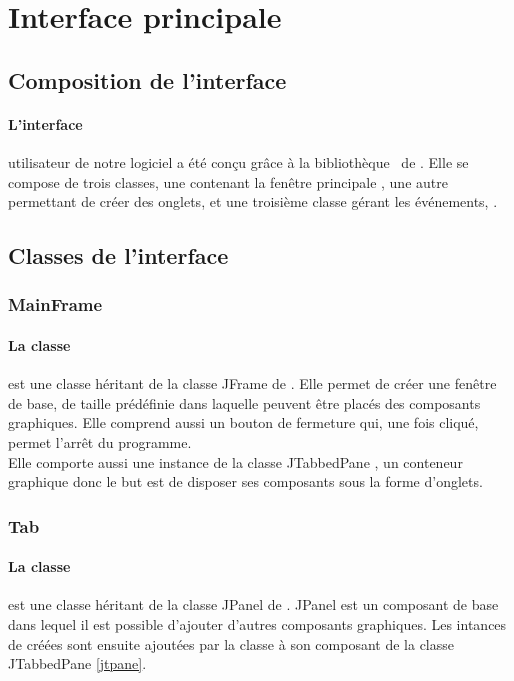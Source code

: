 \clearpage

\section{Interface principale}
\label{sec:menu}

\subsection{Composition de l'interface}

\paragraph{L'interface} utilisateur de notre logiciel a été conçu grâce à la bibliothèque \Swing \ de \Java. Elle se compose de trois classes, une contenant la fenêtre principale , une autre permettant de créer des onglets,  et une troisième classe gérant les événements, .
 
\subsection{Classes de l'interface}

\subsubsection{MainFrame}

\paragraph{La classe } est une classe héritant de la classe JFrame de \Swing. Elle permet de créer une fenêtre de base, de taille prédéfinie dans laquelle peuvent être placés des composants graphiques. Elle comprend aussi un bouton de fermeture qui, une fois cliqué, permet l'arrêt du programme.\\
Elle comporte aussi une instance de la classe JTabbedPane \label{jtpane}, un conteneur graphique donc le but est de disposer ses composants sous la forme d'onglets.

\subsubsection{Tab}

\paragraph{La classe } est une classe héritant de la classe JPanel de \Swing. JPanel est un composant de base dans lequel il est possible d'ajouter d'autres composants graphiques. Les intances de  créées sont ensuite ajoutées par la classe  à son composant de la classe JTabbedPane \ref{jtpane}.


